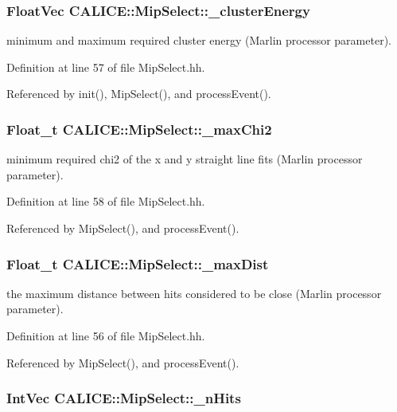 \subsubsection[{\_\-clusterEnergy}]{\setlength{\rightskip}{0pt plus 5cm}FloatVec {\bf CALICE::MipSelect::\_\-clusterEnergy}\hspace{0.3cm}{\ttfamily  [protected]}}\label{classCALICE_1_1MipSelect_a4724ccf37d271a114791a2d0d5575cb9}


minimum and maximum required cluster energy (Marlin processor parameter). 

Definition at line 57 of file MipSelect.hh.

Referenced by init(), MipSelect(), and processEvent().
\subsubsection[{\_\-maxChi2}]{\setlength{\rightskip}{0pt plus 5cm}Float\_\-t {\bf CALICE::MipSelect::\_\-maxChi2}\hspace{0.3cm}{\ttfamily  [protected]}}\label{classCALICE_1_1MipSelect_a9ad0ff3988f10698ba6398158fdba7d3}


minimum required chi2 of the x and y straight line fits (Marlin processor parameter). 

Definition at line 58 of file MipSelect.hh.

Referenced by MipSelect(), and processEvent().
\subsubsection[{\_\-maxDist}]{\setlength{\rightskip}{0pt plus 5cm}Float\_\-t {\bf CALICE::MipSelect::\_\-maxDist}\hspace{0.3cm}{\ttfamily  [protected]}}\label{classCALICE_1_1MipSelect_af5b5c0952ac42edf3e33ccc3354ce999}


the maximum distance between hits considered to be close (Marlin processor parameter). 

Definition at line 56 of file MipSelect.hh.

Referenced by MipSelect(), and processEvent().
\subsubsection[{\_\-nHits}]{\setlength{\rightskip}{0pt plus 5cm}IntVec {\bf CALICE::MipSelect::\_\-nHits}\hspace{0.3cm}{\ttfamily  [protected]}}\label{classCALICE_1_1MipSelect_a9942825c9ee70c394f78dde00c43c8ef}


